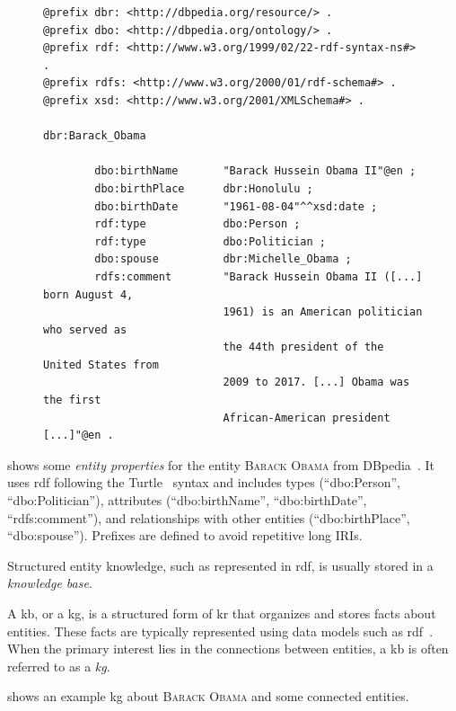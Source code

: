 \begin{figure}[h]
\centering
\begin{lstlisting}[style=rdfstyle,caption={Excerpt from the DBpedia~\cite{dbpedia,dbpedia_auer_nucleus_2007} knowledge base entry of \textsc{Barack Obama}, in Turtle format~\cite{prudhommeaux2014turtle}.},label={lis:obama}]
@prefix dbr: <http://dbpedia.org/resource/> .
@prefix dbo: <http://dbpedia.org/ontology/> .
@prefix rdf: <http://www.w3.org/1999/02/22-rdf-syntax-ns#> .
@prefix rdfs: <http://www.w3.org/2000/01/rdf-schema#> .
@prefix xsd: <http://www.w3.org/2001/XMLSchema#> .

dbr:Barack_Obama

        dbo:birthName       "Barack Hussein Obama II"@en ;
        dbo:birthPlace      dbr:Honolulu ;
        dbo:birthDate       "1961-08-04"^^xsd:date ;
        rdf:type            dbo:Person ;
        rdf:type            dbo:Politician ;
        dbo:spouse          dbr:Michelle_Obama ;
        rdfs:comment        "Barack Hussein Obama II ([...] born August 4,
                            1961) is an American politician who served as
                            the 44th president of the United States from
                            2009 to 2017. [...] Obama was the first
                            African-American president [...]"@en .

\end{lstlisting}
\end{figure}

 shows some \emph{entity properties} for the entity \textsc{Barack Obama} from DBpedia~\cite{dbpedia_auer_nucleus_2007}. It uses \ac{rdf} following the Turtle~\cite{prudhommeaux2014turtle} syntax and includes types (``dbo:Person'', ``dbo:Politician''), attributes (``dbo:birthName'', ``dbo:birthDate'', ``rdfs:comment''), and relationships with other entities (``dbo:birthPlace'', ``dbo:spouse''). Prefixes are defined to avoid repetitive long IRIs.

Structured entity knowledge, such as represented in \ac{rdf}, is usually stored in a \emph{knowledge base}.
%
\begin{definition}[\Acl{kb}]
    A \acf{kb}, or a \acf{kg}, is a structured form of \acl{kr} that organizes and stores facts about entities. 
    These facts are typically represented using data models such as \ac{rdf}~\cite{entityorientedsearch2018}.
    When the primary interest lies in the connections between entities, a \acl{kb} is often referred to as a \emph{\acl{kg}}.
\end{definition}
 shows an example \acl{kg} about \textsc{Barack Obama} and some connected entities.

